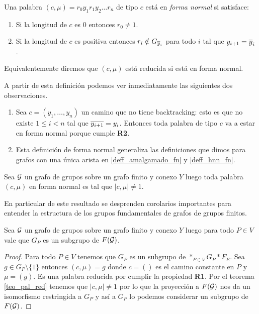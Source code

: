 \documentclass[tesis.tex]{subfiles}
\begin{document}
\begin{deff}
	Una palabra $(c, \mu)=r_0 y_1 r_1 y_2 \dots r_n$ de tipo $c$ está en \emph{forma normal} si satisface:
	\begin{enumerate}[R1.]
		\item Si la longitud de $c$ es $0$ entonces $r_0 \neq 1$.
		\item Si la longitud de $c$ es positiva entonces $r_i \notin G_{\overline y_{i}}$ para todo $i$ tal que $y_{i+1} = \overline y_{i}$.
	\end{enumerate}
\end{deff}

Equivalentemente diremos que $(c, \mu)$ está reducida si está en forma normal. 

A partir de esta definición podemos ver inmediatamente las siguientes dos observaciones.
\begin{enumerate}[1.]
	\item Sea $c=(y_1, \dots, y_n)$ un camino que no tiene backtracking: esto es que no existe $1 \le i  < n$ tal que $\overline {y_{i+1}} = y_{i}$.
	Entonces toda palabra de tipo $c$ va a estar en forma normal porque cumple \textbf{R2}.
	
	\item Esta definición de forma normal generaliza las definiciones que dimos para grafos con una única arista en \ref{deff_amalgamado_fn} y \ref{deff_hnn_fn}.
\end{enumerate}


\begin{teo}\label{teo_pal_red}
	Sea ${\cal G}$ un grafo de grupos sobre un grafo finito y conexo $Y$ luego toda palabra $(c, \mu)$ en forma normal es tal que $|c,\mu| \neq 1$.
\end{teo}

En particular de este resultado se desprenden corolarios importantes para entender la estructura de los grupos fundamentales de grafos de grupos finitos.

\begin{coro}\label{coro_pal_red_1}
	Sea ${\cal G}$ un grafo de grupos sobre un grafo finito y conexo $Y$ luego para todo $P \in V$ vale que $G_P$ es un subgrupo de $F({\cal G})$.
\end{coro}
\begin{proof}
	Para todo $P \in V$ tenemos que $G_P$ es un subgrupo de $\ast_{P \in V} G_P \ast F_E$.
	Sea  $g \in G_{P} \setminus \{ 1 \}$ entonces $(c, \mu) = g$ donde $c = ()$ es el camino constante en $P$ y $\mu = (g)$.
	Es una palabra reducida por cumplir la propiedad \textbf{R1}.
	Por el teorema \ref{teo_pal_red} tenemos que $|c,\mu| \neq 1$ por lo que  la proyección a $F({\cal G})$ nos da un isomorfismo restringida a $G_P$ y así a $G_P$ lo podemos considerar un subgrupo de $F({\cal G})$.
\end{proof}
\end{document}
